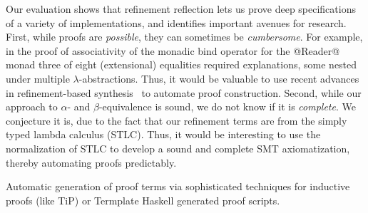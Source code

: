 Our evaluation shows that refinement reflection
lets us prove deep specifications of a variety
of implementations, and identifies
important avenues for research.
%
First, while proofs are \emph{possible}, they can
sometimes be \emph{cumbersome}. For example, in
the proof of associativity of the monadic bind
operator for the @Reader@ monad three of eight
(extensional) equalities required explanations,
some nested under multiple $\lambda$-abstractions.
%
Thus, it would be valuable to use recent
advances in refinement-based synthesis~\cite{polikarpova16}
to automate proof construction.
%
Second, while our approach to $\alpha$- and
$\beta$-equivalence is sound, we do not know
if it is \emph{complete}. We conjecture it is,
due to the fact that our refinement terms
are from the simply typed lambda calculus (STLC).
%
Thus, it would be interesting to use the
normalization of STLC to develop a sound
and complete SMT axiomatization, thereby
automating proofs predictably.

Automatic generation of proof terms via sophisticated 
techniques for inductive proofs (like TiP)
or Termplate Haskell generated proof scripts. 



